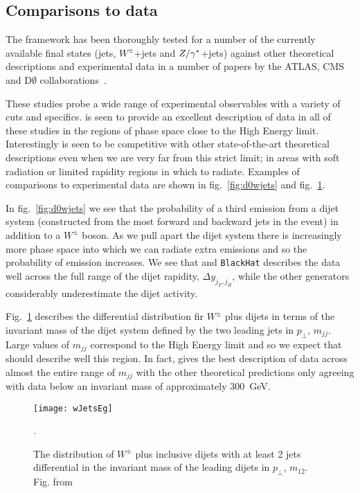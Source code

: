 	\subsection{Comparisons to data}

		The \hej framework has been thoroughly tested for a number of the currently available final states (jets,
		$W^\pm$+jets and $Z/\gamma^*$+jets) against other theoretical descriptions and experimental data in a number of
		papers by the ATLAS, CMS and D$\emptyset$ collaborations~\cite{Aad:2011jz,Aad:2014pua,Aad:2014qxa,Aad:2014rta,
		Chatrchyan:2012gwa,Abazov:2013gpa,ZPaper}.

		These studies probe a wide range of experimental observables with a variety of cuts and specifics.
		\hej is seen to provide an excellent description of data in all of these studies in the regions
		of phase space close to the High Energy limit.  Interestingly \HEJ is seen to be competitive with
		other state-of-the-art theoretical descriptions even when we are very far from this strict limit;
		in areas with soft radiation or limited rapidity regions in which to radiate.  Examples of comparisons
		to experimental data are shown in fig.~\ref{fig:d0wjets} and fig.~\ref{fig:wJetsEg}.

		In fig.~\ref{fig:d0wjets} we see that the probability of a third emission from a dijet system (constructed
		from the most forward and backward jets in the event) in addition to a $W^\pm$ boson.  As we pull apart the
		dijet system there is increasingly more phase space into which we can radiate extra emissions and so the
		probability of emission increases.  We see that \HEJ and \texttt{BlackHat} describes the data well across
		the full range of the dijet rapidity, $\Delta y_{j_F, j_B}$, while the other generators considerably
		underestimate the dijet activity.

		Fig.~\ref{fig:wJetsEg} describes the differential distribution fir $W^\pm$ plus dijets in terms of the
		invariant mass of the dijet system defined by the two leading jets in $p_\perp$, $m_{jj}$.  Large values
		of $m_{jj}$ correspond to the High Energy limit and so we expect that \hej should describe well this region.
		In fact, \HEJ gives the best description of data across almost the entire range of $m_{jj}$ with the other
		theoretical predictions only agreeing with data below an invariant mass of approximately $300$~GeV.

		\begin{figure}
			\begin{center}
			\texttt{[image: wJetsEg]}
			\caption{The distribution of $W^\pm$ plus inclusive dijets with at least
			2 jets differential in the invariant mass of the leading dijets in $p_\perp$, $m_{12}$.
			Fig. from \cite{Aad:2014qxa}}.
			\label{fig:wJetsEg}
			\end{center}
		\end{figure}

